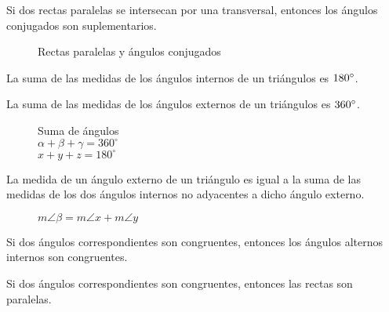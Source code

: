\begin{theorem}
    Si dos rectas paralelas se intersecan por una transversal, entonces los ángulos conjugados son suplementarios.

\begin{figure}[!h]
    \centering
    
    \caption{$m\angle{\alpha} + m\angle{\beta} = \degs{180}$}
    \caption{Rectas paralelas y ángulos conjugados}
    \label{fig:paralela-cong-suplement}
\end{figure}
    
\end{theorem}

\clearpage

\begin{theorem}
    La suma de las medidas de los ángulos internos de un triángulos es $180^{\circ}$.
\end{theorem}

\begin{theorem}
    La suma de las medidas de los ángulos externos de un triángulos es $360^{\circ}$.
\end{theorem}

\begin{figure}[!h]
    \centering
    
    \caption{Suma de ángulos \\ $\alpha + \beta + \gamma = 360^{\circ}$\\$ x + y + z = 180^{\circ}$}
    \label{fig:suma-ang-360}
\end{figure}

\begin{theorem}
    La medida de un ángulo externo de un triángulo es igual a la suma de las medidas de los dos ángulos internos no adyacentes a dicho ángulo externo.

\begin{figure}[!h]
    \centering
    
    \caption{$m\angle{\beta} = m\angle{x} + m\angle{y}$}
    \label{fig:suma-ang-int-no-adyac}
\end{figure}
    
\end{theorem}

\begin{theorem}
    Si dos ángulos correspondientes son congruentes, entonces los ángulos alternos internos son congruentes.
\end{theorem}

\begin{theorem}
    Si dos ángulos correspondientes son congruentes, entonces las rectas son paralelas.
\end{theorem}

